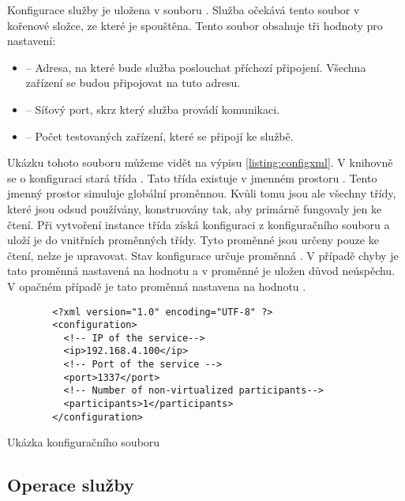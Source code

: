 Konfigurace služby je uložena v souboru . Služba očekává tento soubor v kořenové složce, ze které je spouštěna. Tento soubor obsahuje tři hodnoty pro nastavení:

\begin{itemize}
    \item {} -- Adresa, na které bude služba poslouchat příchozí připojení. Všechna zařízení se budou připojovat na tuto adresu.
    \item {} -- Síťový port, skrz který služba provádí komunikaci.
    \item {} -- Počet testovaných zařízení, které se připojí ke službě.   
\end{itemize}

Ukázku tohoto souboru můžeme vidět na výpisu \ref{listing:configxml}. V knihovně se o konfiguraci stará třída . Tato třída existuje v jmenném prostoru . Tento jmenný prostor simuluje globální proměnnou. Kvůli tomu jsou ale všechny třídy, které jsou odsud používány, konstruovány tak, aby primárně fungovaly jen ke čtení. Při vytvoření instance třída získá konfiguraci z konfiguračního souboru a uloží je do vnitřních proměnných třídy. Tyto proměnné jsou určeny pouze ke čtení, nelze je upravovat. Stav konfigurace určuje proměnná . V případě chyby je tato proměnná nastavená na hodnotu  a v proměnné  je uložen důvod neúspěchu. V opačném případě je tato proměnná nastavena na hodnotu .

\begin{listing}[htbp]
    \centering
    \begin{verbatim}
        <?xml version="1.0" encoding="UTF-8" ?>
        <configuration>
          <!-- IP of the service-->
          <ip>192.168.4.100</ip>
          <!-- Port of the service -->
          <port>1337</port>
          <!-- Number of non-virtualized participants-->
          <participants>1</participants>
        </configuration>
    \end{verbatim}
    \caption{Ukázka konfiguračního souboru}
    \label{listing:configxml}
\end{listing}


\subsection{Operace služby}

